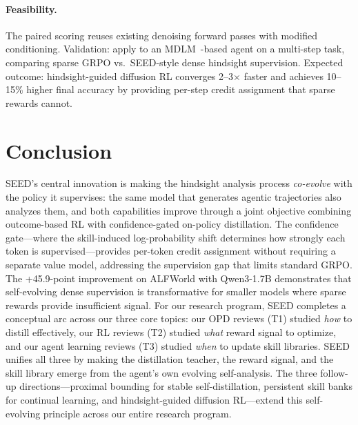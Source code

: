 \documentclass[11pt,a4paper]{article}
\begin{document}
\paragraph{Feasibility.} The paired scoring reuses existing denoising forward passes with modified conditioning. Validation: apply to an MDLM~\cite{sumi2026}-based agent on a multi-step task, comparing sparse GRPO vs.\ SEED-style dense hindsight supervision. Expected outcome: hindsight-guided diffusion RL converges 2--3$\times$ faster and achieves 10--15\% higher final accuracy by providing per-step credit assignment that sparse rewards cannot.

\section{Conclusion}

SEED's central innovation is making the hindsight analysis process \emph{co-evolve} with the policy it supervises: the same model that generates agentic trajectories also analyzes them, and both capabilities improve through a joint objective combining outcome-based RL with confidence-gated on-policy distillation. The confidence gate---where the skill-induced log-probability shift determines how strongly each token is supervised---provides per-token credit assignment without requiring a separate value model, addressing the supervision gap that limits standard GRPO. The +45.9-point improvement on ALFWorld with Qwen3-1.7B demonstrates that self-evolving dense supervision is transformative for smaller models where sparse rewards provide insufficient signal. For our research program, SEED completes a conceptual arc across our three core topics: our OPD reviews (T1) studied \emph{how} to distill effectively, our RL reviews (T2) studied \emph{what} reward signal to optimize, and our agent learning reviews (T3) studied \emph{when} to update skill libraries. SEED unifies all three by making the distillation teacher, the reward signal, and the skill library emerge from the agent's own evolving self-analysis. The three follow-up directions---proximal bounding for stable self-distillation, persistent skill banks for continual learning, and hindsight-guided diffusion RL---extend this self-evolving principle across our entire research program.
\end{document}
